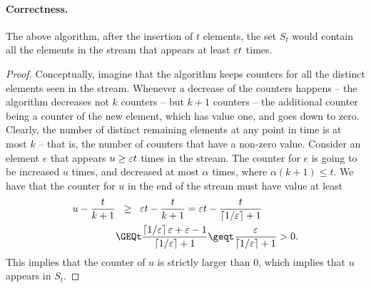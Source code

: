 \paragraph*{Correctness.}

\begin{lemma}
    The above algorithm, after the insertion of $t$ elements, the set
    $S_{t}$ would contain all the elements in the stream that
    appears at least ${\varepsilon} t$ times. 
\end{lemma}
\begin{proof}
    Conceptually, imagine that the algorithm keeps counters for all
    the distinct elements seen in the stream. Whenever a decrease of
    the counters happens -- the algorithm decreases not $k$ counters --
    but $k+1$ counters -- the additional counter being a counter of
    the new element, which has value one, and goes down to zero.
    Clearly, the number of distinct remaining elements at any point in
    time is at most $k$ -- that is, the number of counters that have a
    non-zero value.  Consider an element $e$ that appears
    $u \geq {\varepsilon} t$ times in the stream. The counter for $e$ is going
    to be increased $u$ times, and decreased at most $\alpha$ times,
    where
    \begin{math}
        \alpha (k+1) \leq t.
    \end{math}
    We have that the counter for $u$ in the end of the stream must
    have value at least
    \begin{align*}
        u - \frac{t}{k+1}%
        &\GEQ%
        \eps t - \frac{t}{k+1}
        = 
        \eps t - \frac{t}{\ceil{1/\eps}+1}
        \\&
        \GEQ%
        t \frac{\ceil{1/\eps}\eps +\eps - 1}{\ceil{1/\eps}+1}
        \geq%
        t \frac{\eps}{\ceil{1/\eps}+1} > 0.
    \end{align*}
    This implies that the counter of $u$ is strictly larger than $0$,
    which implies that $u$ appears in $S_{t}$.
\end{proof}










